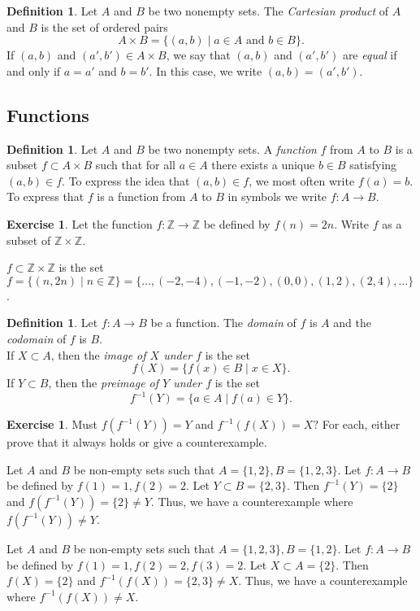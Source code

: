 \documentclass[11pt]{article}
\newcommand{\bbZ}{\mathbb{Z}}
\theoremstyle{definition}
\newtheorem{definition}[theorem]{Definition}
\newtheorem{exercise}[theorem]{Exercise}
\numberwithin{equation}{subsection}
\begin{document}
\begin{definition}  Let $A$ and $B$ be two nonempty sets. 
The \emph{Cartesian product} of $A$ and $B$ is the set of ordered pairs
\[
A \times B = \{ (a, b) \mid \text{$a \in A$ and $b \in B$} \}.
\]
If $(a, b)$ and $(a', b') \in A \times B$, we say that $(a, b)$ and $(a', b')$ are
\emph{equal} if and only if $a = a'$ and $b = b'$. In this case, we write $
(a, b) = (a', b').$


\end{definition}




\subsection*{Functions}

\begin{definition} Let $A$ and $B$ be two nonempty sets.  
A \emph{function} $f$ from $A$ to $B$ is a subset $f \subset A \times B$ such that for all $a \in A$ there exists a unique $b \in B$ satisfying $(a, b) \in f$.  To express the idea that $(a, b) \in f$, we most
often write $f(a) = b$.  To express that $f$ is a function from $A$ to $B$ in symbols we write $f \colon A \rightarrow B$.  
\end{definition}


\begin{exercise}  
Let the function $f \colon \mathbb{Z} \rightarrow \mathbb{Z}$ be defined by
$f(n)=2n$.  Write $f$ as a subset of $\mathbb{Z} \times \mathbb{Z}$.  

$f \subset \bbZ \times \bbZ$ is the set $f = \{\left(n, 2n\right) \mid n \in \bbZ\} = \{\dots, (-2, -4), (-1, -2), (0,0), (1,2), (2,4), \dots\}$.

\end{exercise}

\begin{definition}  Let $f \colon A \rightarrow B$ be a function.  The \emph{domain} of $f$ is $A$ and the \emph{codomain} of $f$ is $B.$\\
If $X \subset A$, then the \emph{image of $X$ under $f$} is the set
\[
f(X) = \{ f(x) \in B \mid  x \in X \}.
\]
If $Y \subset B$, then the \emph{preimage of $Y$ under $f$} is the set
\[
f^{-1}(Y) = \{ a \in A \mid f(a) \in Y \}.
\]
\end{definition}

\begin{exercise}
Must $f(f^{-1}(Y))=Y$ and $f^{-1}(f(X))=X?$ For each, either prove that it always holds or give a counterexample.

Let $A$ and $B$ be non-empty sets such that $A=\{1,2\}, B =\{1,2,3\}$. Let $f \colon A \rightarrow B$ be defined by $f(1) = 1, f(2)=2$. Let $Y \subset B=\{2,3\}$. Then $f^{-1}(Y)=\{2\}$ and $f(f^{-1}(Y))=\{2\}\not=Y$. Thus, we have a counterexample where $f(f^{-1}(Y))\not=Y$.

Let $A$ and $B$ be non-empty sets such that $A=\{1,2,3\}, B =\{1,2\}$. Let $f \colon A \rightarrow B$ be defined by $f(1) = 1, f(2)=2, f(3)=2$. Let $X \subset A=\{2\}$. Then $f(X)=\{2\}$ and $f^{-1}(f(X))=\{2,3\}\not=X$. Thus, we have a counterexample where $f^{-1}(f(X))\not=X$.

\end{exercise}
\end{document}
